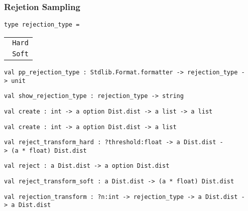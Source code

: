 \hypertarget{rejux5fhelpers}{\subsubsection{\texorpdfstring{\protect\hyperlink{rejux5fhelpers}{}Rejetion
Sampling}{Rejetion Sampling}}\label{rejux5fhelpers}}

\protect\hyperlink{type-rejectionux5ftype}{}\texttt{type\ rejection\_type}\texttt{\ =\ }

\begin{longtable}[c]{@{}l@{}}
\toprule
\protect\hyperlink{type-rejectionux5ftype.Hard}{}\texttt{\textbar{}\ }\texttt{Hard}\tabularnewline
\protect\hyperlink{type-rejectionux5ftype.Soft}{}\texttt{\textbar{}\ }\texttt{Soft}\tabularnewline
\bottomrule
\end{longtable}

\protect\hyperlink{val-ppux5frejectionux5ftype}{}\texttt{val\ pp\_rejection\_type\ :\ Stdlib.Format.formatter\ -\textgreater{}\ rejection\_type\ -\textgreater{}\ unit}

\protect\hyperlink{val-showux5frejectionux5ftype}{}\texttt{val\ show\_rejection\_type\ :\ rejection\_type\ -\textgreater{}\ string}

\protect\hyperlink{val-createux27}{}\texttt{val\ create\textquotesingle{}\ :\ int\ -\textgreater{}\ \textquotesingle{}a\ option\ Dist.dist\ -\textgreater{}\ \textquotesingle{}a\ list\ -\textgreater{}\ \textquotesingle{}a\ list}

\protect\hyperlink{val-create}{}\texttt{val\ create\ :\ int\ -\textgreater{}\ \textquotesingle{}a\ option\ Dist.dist\ -\textgreater{}\ \textquotesingle{}a\ list}

\protect\hyperlink{val-rejectux5ftransformux5fhard}{}\texttt{val\ reject\_transform\_hard\ :\ ?⁠threshold:float\ -\textgreater{}\ \textquotesingle{}a\ Dist.dist\ -\textgreater{}\ (\textquotesingle{}a\ *\ float)\ Dist.dist}

\protect\hyperlink{val-rejectux27ux27}{}\texttt{val\ reject\textquotesingle{}\textquotesingle{}\ :\ \textquotesingle{}a\ Dist.dist\ -\textgreater{}\ \textquotesingle{}a\ option\ Dist.dist}

\protect\hyperlink{val-rejectux5ftransformux5fsoft}{}\texttt{val\ reject\_transform\_soft\ :\ \textquotesingle{}a\ Dist.dist\ -\textgreater{}\ (\textquotesingle{}a\ *\ float)\ Dist.dist}

\protect\hyperlink{val-rejectionux5ftransform}{}\texttt{val\ rejection\_transform\ :\ ?⁠n:int\ -\textgreater{}\ rejection\_type\ -\textgreater{}\ \textquotesingle{}a\ Dist.dist\ -\textgreater{}\ \textquotesingle{}a\ Dist.dist}

